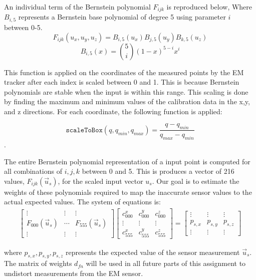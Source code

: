 \documentclass[letterpaper, 11pt]{report}
\begin{document}
An individual term of the Bernstein polynomial $F_{ijk}$ is reproduced below, Where $B_{i,5}$ represents a Bernstein base polynomial of degree 5 using parameter $i$ between 0-5.
$$F_{ijk}(u_x,u_y,u_z) = B_{i,5}(u_x)B_{j,5}(u_y)B_{k,5}(u_z)$$
$$B_{i,5}(x) = \binom{5}{i}(1-x)^{5-i}x^i$$

This function is applied on the coordinates of the measured points by the EM tracker after each index is scaled between 0 and 1. This is because Bernstein polynomials are stable when the input is within this range. This scaling is done by finding the maximum and minimum values of the calibration data in the x,y, and z directions. For each coordinate, the following function is applied:

$$\texttt{scaleToBox}(q,q_{min},q_{max}) = \frac{q - q_{min}}{q_{max} - q_{min}}$$.

The entire Bernstein polynomial representation of a input point is computed for all combinations of $i,j,k$ between 0 and 5. This is produces a vector of 216 values, $F_{ijk}(\vec u_s)$, for the scaled input vector $u_s$. Our goal is to estimate the weights of these polynomials required to map the inaccurate sensor values to the actual expected values. The system of equations is:
\begin{align*}
\begin{bmatrix}
    \vdots & \vdots & \vdots \\
    F_{000}(\vec u_s) & \cdots & F_{555}(\vec u_s) \\
    \vdots & \vdots & \vdots
    \end{bmatrix} \begin{bmatrix}
                    c_{000}^{x} & c_{000}^{y} & c_{000}^{z} \\
                    \vdots & \vdots & \vdots \\
                    c_{555}^{x} & c_{555}^{y} & c_{555}^{z}
                    \end{bmatrix} =                                                     \begin{bmatrix}
                      \vdots & \vdots & \vdots \\
                      p_{s,x} & p_{s,y} & p_{s,z} \\
                      \vdots & \vdots & \vdots
                      \end{bmatrix}         
\end{align*}

where $p_{s,x}, p_{s,y},p_{s,z}$ represents the expected value of the sensor measurement $\vec u_s$. The matrix of weights $d_{fn}$ will be used in all future parts of this assignment to undistort measurements from the EM sensor.
\end{document}
